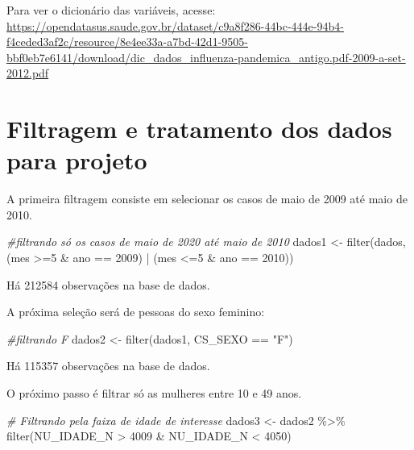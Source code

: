 \documentclass[
]{article}
\newenvironment{Shaded}{\begin{snugshade}}{\end{snugshade}}
\newcommand{\CommentTok}[1]{\textcolor[rgb]{0.56,0.35,0.01}{\textit{#1}}}
\newcommand{\DecValTok}[1]{\textcolor[rgb]{0.00,0.00,0.81}{#1}}
\newcommand{\FunctionTok}[1]{\textcolor[rgb]{0.00,0.00,0.00}{#1}}
\newcommand{\NormalTok}[1]{#1}
\newcommand{\OtherTok}[1]{\textcolor[rgb]{0.56,0.35,0.01}{#1}}
\newcommand{\SpecialCharTok}[1]{\textcolor[rgb]{0.00,0.00,0.00}{#1}}
\newcommand{\StringTok}[1]{\textcolor[rgb]{0.31,0.60,0.02}{#1}}
\begin{document}
Para ver o dicionário das variáveis, acesse:
\url{https://opendatasus.saude.gov.br/dataset/c9a8f286-44bc-444e-94b4-f4ceded3af2c/resource/8e4ee33a-a7bd-42d1-9505-bbf0eb7e6141/download/dic_dados_influenza-pandemica_antigo.pdf-2009-a-set-2012.pdf}

\hypertarget{filtragem-e-tratamento-dos-dados-para-projeto}{%
\section{Filtragem e tratamento dos dados para
projeto}\label{filtragem-e-tratamento-dos-dados-para-projeto}}

A primeira filtragem consiste em selecionar os casos de maio de 2009 até
maio de 2010.

\begin{Shaded}
\begin{Highlighting}[]
\CommentTok{\#filtrando só os casos de maio de 2020 até maio de 2010}
\NormalTok{dados1 }\OtherTok{\textless{}{-}} \FunctionTok{filter}\NormalTok{(dados, }
\NormalTok{                 (mes }\SpecialCharTok{\textgreater{}=}\DecValTok{5} \SpecialCharTok{\&}\NormalTok{ ano }\SpecialCharTok{==} \DecValTok{2009}\NormalTok{) }\SpecialCharTok{|}\NormalTok{ (mes }\SpecialCharTok{\textless{}=}\DecValTok{5} \SpecialCharTok{\&}\NormalTok{ ano }\SpecialCharTok{==} \DecValTok{2010}\NormalTok{))}
\end{Highlighting}
\end{Shaded}

Há 212584 observações na base de dados.

A próxima seleção será de pessoas do sexo feminino:

\begin{Shaded}
\begin{Highlighting}[]
\CommentTok{\#filtrando F}
\NormalTok{dados2 }\OtherTok{\textless{}{-}} \FunctionTok{filter}\NormalTok{(dados1, CS\_SEXO }\SpecialCharTok{==} \StringTok{"F"}\NormalTok{)}
\end{Highlighting}
\end{Shaded}

Há 115357 observações na base de dados.

O próximo passo é filtrar só as mulheres entre 10 e 49 anos.

\begin{Shaded}
\begin{Highlighting}[]
\CommentTok{\# Filtrando pela faixa de idade de interesse}
\NormalTok{dados3 }\OtherTok{\textless{}{-}}\NormalTok{ dados2 }\SpecialCharTok{\%\textgreater{}\%} 
  \FunctionTok{filter}\NormalTok{(NU\_IDADE\_N }\SpecialCharTok{\textgreater{}} \DecValTok{4009} \SpecialCharTok{\&}\NormalTok{ NU\_IDADE\_N }\SpecialCharTok{\textless{}} \DecValTok{4050}\NormalTok{)}
\end{Highlighting}
\end{Shaded}
\end{document}
